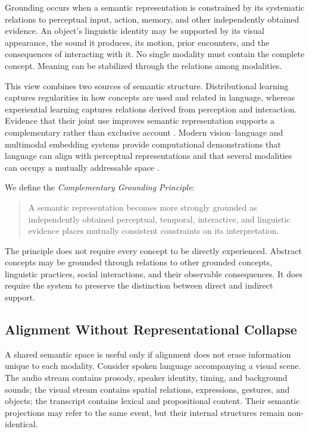 Grounding occurs when a semantic representation is constrained by its systematic relations to perceptual input, action, memory, and other independently obtained evidence. An object's linguistic identity may be supported by its visual appearance, the sound it produces, its motion, prior encounters, and the consequences of interacting with it. No single modality must contain the complete concept. Meaning can be stabilized through the relations among modalities.

This view combines two sources of semantic structure. Distributional learning captures regularities in how concepts are used and related in language, whereas experiential learning captures relations derived from perception and interaction. Evidence that their joint use improves semantic representation supports a complementary rather than exclusive account \cite{andrews2009integrating,louwerse2011symbol}. Modern vision--language and multimodal embedding systems provide computational demonstrations that language can align with perceptual representations and that several modalities can occupy a mutually addressable space \cite{radford2021clip,girdhar2023imagebind}.

We define the \emph{Complementary Grounding Principle}:

\begin{quote}
A semantic representation becomes more strongly grounded as independently obtained perceptual, temporal, interactive, and linguistic evidence places mutually consistent constraints on its interpretation.
\end{quote}

The principle does not require every concept to be directly experienced. Abstract concepts may be grounded through relations to other grounded concepts, linguistic practices, social interactions, and their observable consequences. It does require the system to preserve the distinction between direct and indirect support.

\subsection{Alignment Without Representational Collapse}
\label{subsec:alignment-without-collapse}

A shared semantic space is useful only if alignment does not erase information unique to each modality. Consider spoken language accompanying a visual scene. The audio stream contains prosody, speaker identity, timing, and background sounds; the visual stream contains spatial relations, expressions, gestures, and objects; the transcript contains lexical and propositional content. Their semantic projections may refer to the same event, but their internal structures remain non-identical.

